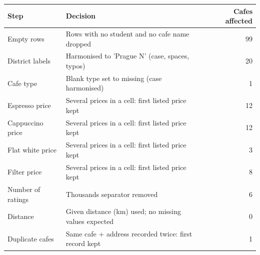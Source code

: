 \begin{tabular}{lp{8.2cm}r}
  \toprule
Step & Decision & Cafes affected \\ 
  \midrule
Empty rows & Rows with no student and no cafe name dropped & 99 \\ 
  District labels & Harmonised to 'Prague N' (case, spaces, typos) & 20 \\ 
  Cafe type & Blank type set to missing (case harmonised) & 1 \\ 
  Espresso price & Several prices in a cell: first listed price kept & 12 \\ 
  Cappuccino price & Several prices in a cell: first listed price kept & 12 \\ 
  Flat white price & Several prices in a cell: first listed price kept & 3 \\ 
  Filter price & Several prices in a cell: first listed price kept & 8 \\ 
  Number of ratings & Thousands separator removed & 6 \\ 
  Distance & Given distance (km) used; no missing values expected & 0 \\ 
  Duplicate cafes & Same cafe + address recorded twice: first record kept & 1 \\ 
   \bottomrule
\end{tabular}
